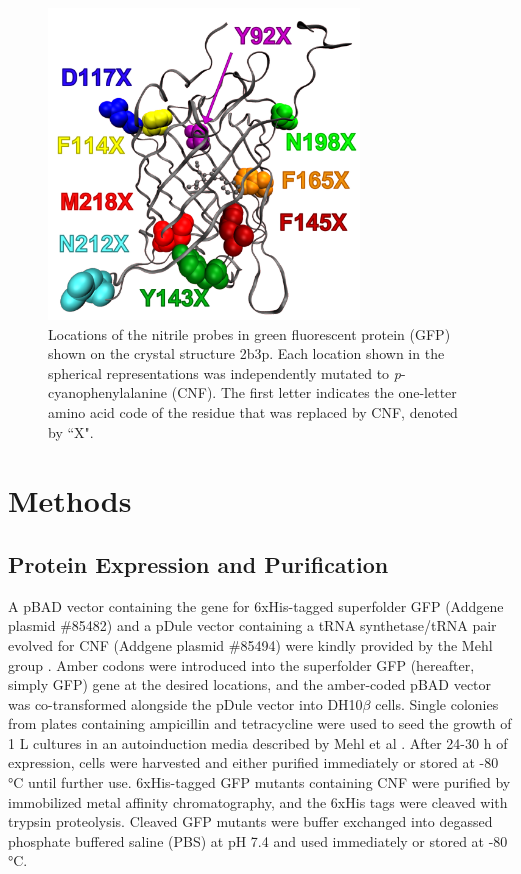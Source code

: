 \begin{figure}
    \center
    \includegraphics[width=3.25in]{figures-gfp-hbond/system.png}
    \caption{Locations of the nitrile probes in green fluorescent protein (GFP) shown on the crystal structure 2b3p. Each location shown in the spherical representations was independently mutated to \emph{p}-cyanophenylalanine (CNF). The first letter indicates the one-letter amino acid code of the residue that was replaced by CNF, denoted by ``X".}
    \label{fig:hbond-system}
\end{figure}

\section{Methods}

\subsection{Protein Expression and Purification}

A pBAD vector containing the gene for 6xHis-tagged superfolder GFP (Addgene plasmid \#85482) and a pDule vector containing a tRNA synthetase/tRNA pair evolved for CNF (Addgene plasmid \#85494) were kindly provided by the Mehl group \cite{Miyake-Stoner2009, Miyake-Stoner2010}.
Amber codons were introduced into the superfolder GFP (hereafter, simply GFP) gene at the desired locations, and the amber-coded pBAD vector was co-transformed alongside the pDule vector into DH10$\beta$ cells.
Single colonies from plates containing ampicillin and tetracycline were used to seed the growth of 1 L cultures in an autoinduction media described by Mehl et al \cite{Hammill2007}.
After 24-30 h of expression, cells were harvested and either purified immediately or stored at -80 \si{\celsius} until further use.
6xHis-tagged GFP mutants containing CNF were purified by immobilized metal affinity chromatography, and the 6xHis tags were cleaved with trypsin proteolysis.
Cleaved GFP mutants were buffer exchanged into degassed phosphate buffered saline (PBS) at pH 7.4 and used immediately or stored at -80 \si{\celsius}. 

